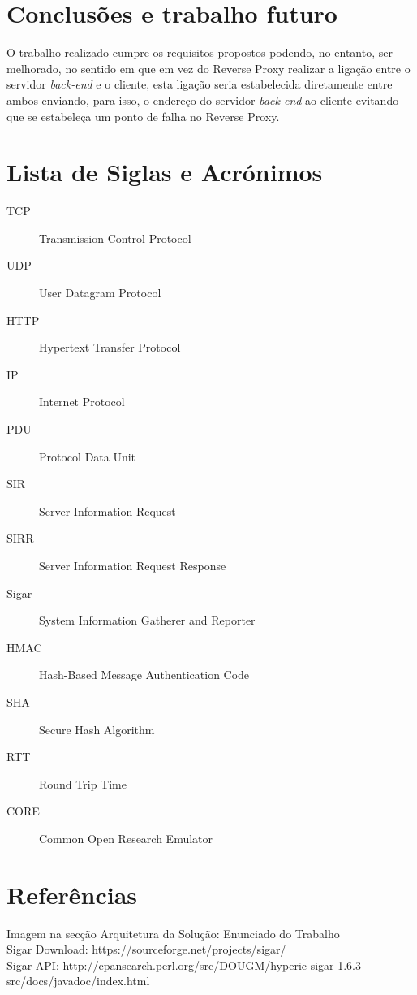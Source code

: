 \documentclass{article}
\begin{document}
\section{Conclusões e trabalho futuro}
O trabalho realizado cumpre os requisitos propostos podendo, no entanto, ser melhorado, no sentido em que em vez do Reverse Proxy realizar a ligação entre o servidor \textit{back-end} e o cliente, esta ligação seria estabelecida diretamente entre ambos enviando, para isso, o endereço do servidor \textit{back-end} ao cliente evitando que se estabeleça um ponto de falha no Reverse Proxy.

\section{Lista de Siglas e Acrónimos}
\begin{description}
    \item [TCP] Transmission Control Protocol
    \item [UDP] User Datagram Protocol
    \item [HTTP] Hypertext Transfer Protocol
    \item [IP] Internet Protocol
    \item [PDU] Protocol Data Unit
    \item [SIR] Server Information Request
    \item [SIRR] Server Information Request Response
    \item [Sigar] System Information Gatherer and Reporter
    \item [HMAC] Hash-Based Message Authentication Code
    \item [SHA] Secure Hash Algorithm
    \item [RTT] Round Trip Time
    \item [CORE] Common Open Research Emulator
\end{description}

\section{Referências}
Imagem na secção Arquitetura da Solução: Enunciado do Trabalho\\
Sigar Download: https://sourceforge.net/projects/sigar/\\
Sigar API: http://cpansearch.perl.org/src/DOUGM/hyperic-sigar-1.6.3-src/docs/javadoc/index.html\\
\end{document}
